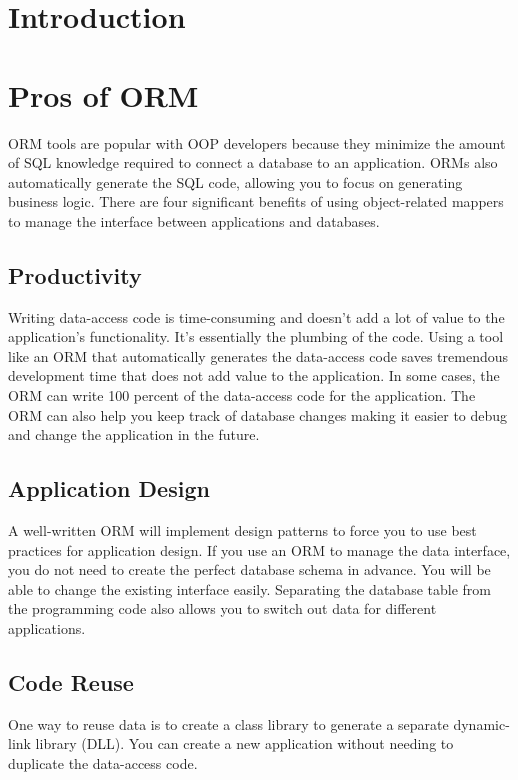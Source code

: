 \documentclass[10pt,a4paper,twoside]{article}
\begin{document}
\section{Introduction}


\section{Pros of ORM}
\item ORM tools are popular with OOP developers because they minimize the amount of SQL knowledge required to connect a database to an application. ORMs also automatically generate the SQL code, allowing you to focus on generating business logic. There are four significant benefits of using object-related mappers to manage the interface between applications and databases.
\subsection{Productivity}
\item Writing data-access code is time-consuming and doesn’t add a lot of value to the application’s functionality. It’s essentially the plumbing of the code. Using a tool like an ORM that automatically generates the data-access code saves tremendous development time that does not add value to the application. In some cases, the ORM can write 100 percent of the data-access code for the application. The ORM can also help you keep track of database changes making it easier to debug and change the application in the future.
\subsection{Application Design}
\item A well-written ORM will implement design patterns to force you to use best practices for application design. If you use an ORM to manage the data interface, you do not need to create the perfect database schema in advance. You will be able to change the existing interface easily. Separating the database table from the programming code also allows you to switch out data for different applications.
\subsection{Code Reuse}
\item One way to reuse data is to create a class library to generate a separate dynamic-link library (DLL). You can create a new application without needing to duplicate the data-access code.
\end{document}
